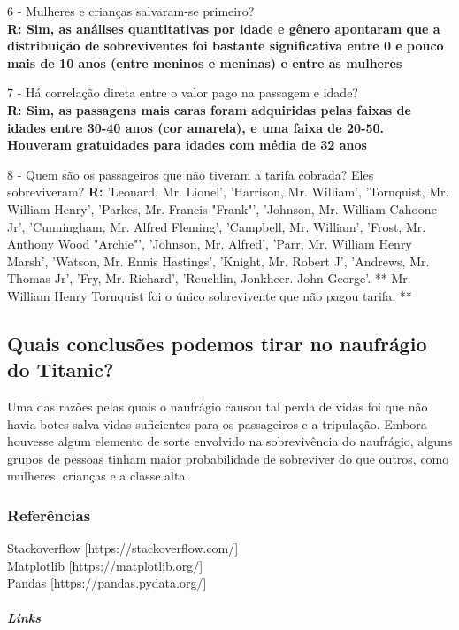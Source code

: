 \documentclass[11pt]{article}
\begin{document}
6 - Mulheres e crianças salvaram-se primeiro?\\
\textbf{R: Sim, as análises quantitativas por idade e gênero apontaram
que a distribuição de sobreviventes foi bastante significativa entre 0 e
pouco mais de 10 anos (entre meninos e meninas) e entre as mulheres }

7 - Há correlação direta entre o valor pago na passagem e idade?\\
\textbf{R: Sim, as passagens mais caras foram adquiridas pelas faixas de
idades entre 30-40 anos (cor amarela), e uma faixa de 20-50. Houveram
gratuidades para idades com média de 32 anos }

8 - Quem são os passageiros que não tiveram a tarifa cobrada? Eles
sobreviveram? \textbf{R: } 'Leonard, Mr. Lionel', 'Harrison, Mr.
William', 'Tornquist, Mr. William Henry', 'Parkes, Mr. Francis "Frank"',
'Johnson, Mr. William Cahoone Jr', 'Cunningham, Mr. Alfred Fleming',
'Campbell, Mr. William', 'Frost, Mr. Anthony Wood "Archie"', 'Johnson,
Mr. Alfred', 'Parr, Mr. William Henry Marsh', 'Watson, Mr. Ennis
Hastings', 'Knight, Mr. Robert J', 'Andrews, Mr. Thomas Jr', 'Fry, Mr.
Richard', 'Reuchlin, Jonkheer. John George'. ** Mr. William Henry
Tornquist foi o único sobrevivente que não pagou tarifa. **

    \subsection{Quais conclusões podemos tirar no naufrágio do
Titanic?}\label{quais-conclusuxf5es-podemos-tirar-no-naufruxe1gio-do-titanic}

    Uma das razões pelas quais o naufrágio causou tal perda de vidas foi que
não havia botes salva-vidas suficientes para os passageiros e a
tripulação. Embora houvesse algum elemento de sorte envolvido na
sobrevivência do naufrágio, alguns grupos de pessoas tinham maior
probabilidade de sobreviver do que outros, como mulheres, crianças e a
classe alta.

    \subsubsection{Referências}\label{referuxeancias}

Stackoverflow {[}https://stackoverflow.com/{]}\\
Matplotlib {[}https://matplotlib.org/{]}\\
Pandas {[}https://pandas.pydata.org/{]}

\subparagraph{Links}\label{links}
\end{document}
